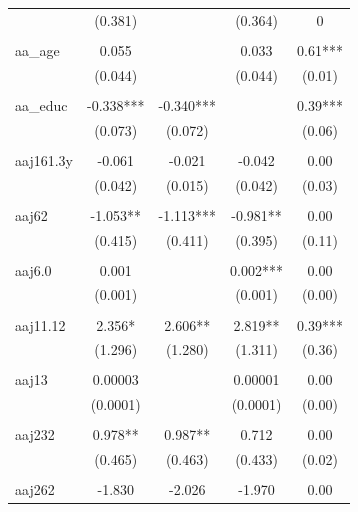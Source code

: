 \documentclass[12pt, a4paper]{article}
\begin{document}
{\begin{longtable}{@{\extracolsep{5pt}}lcccc}
				& (0.381)    &            & (0.364)   & 0       \\
				&            &            &           &         \\
				aa\_age    & 0.055      &            & 0.033     & 0.61*** \\
				& (0.044)    &            & (0.044)   & (0.01)  \\
				&            &            &           &         \\
				aa\_educ   & -0.338***  & -0.340***  &           & 0.39*** \\
				& (0.073)    & (0.072)    &           & (0.06)  \\
				&            &            &           &         \\
				aaj161.3y  & -0.061     & -0.021     & -0.042    & 0.00    \\
				& (0.042)    & (0.015)    & (0.042)   & (0.03)  \\
				&            &            &           &         \\
				aaj62      & -1.053**   & -1.113***  & -0.981**  & 0.00    \\
				& (0.415)    & (0.411)    & (0.395)   & (0.11)  \\
				&            &            &           &         \\
				aaj6.0     & 0.001      &            & 0.002***  & 0.00    \\
				& (0.001)    &            & (0.001)   & (0.00)  \\
				&            &            &           &         \\
				aaj11.12   & 2.356*     & 2.606**    & 2.819**   & 0.39*** \\
				& (1.296)    & (1.280)    & (1.311)   & (0.36)  \\
				&            &            &           &         \\
				aaj13      & 0.00003    &            & 0.00001   & 0.00    \\
				& (0.0001)   &            & (0.0001)  & (0.00)  \\
				&            &            &           &         \\
				aaj232     & 0.978**    & 0.987**    & 0.712     & 0.00    \\
				& (0.465)    & (0.463)    & (0.433)   & (0.02)  \\
				&            &            &           &         \\
				aaj262     & -1.830     & -2.026     & -1.970    & 0.00    \\

\end{longtable}}
\end{document}
